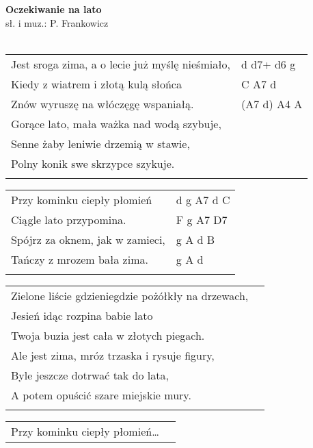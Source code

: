 \documentclass[a5paper]{article}
\begin{document}


\noindent
\fontsize{12pt}{15pt}\selectfont
\textbf{Oczekiwanie na lato} \\
\fontsize{8pt}{10pt}\selectfont
sł. i muz.: P. Frankowicz \\ \\
\fontsize{10pt}{12pt}\selectfont
{}
\begin{tabular}{@{}p{8.00cm}p{3cm}@{}}
\noindent
Jest sroga zima, a o lecie już myślę nieśmiało, & d d7+ d6 g \\
Kiedy z wiatrem i złotą kulą słońca & C A7 d \\
Znów wyruszę na włóczęgę wspaniałą. & (A7 d) A4 A \\
Gorące lato, mała ważka nad wodą szybuje, \\
Senne żaby leniwie drzemią w stawie, \\
Polny konik swe skrzypce szykuje. \\ \\
\end{tabular}

\noindent
\begin{tabular}{@{}p{7.00cm}p{3cm}@{}}
Przy kominku ciepły płomień & d g A7 d C \\
Ciągle lato przypomina. & F g A7 D7 \\
Spójrz za oknem, jak w zamieci, & g A d B \\
Tańczy z mrozem bała zima. & g A d \\ \\
\end{tabular}

\noindent
\begin{tabular}{@{}p{8.00cm}p{3cm}@{}}
Zielone liście gdzieniegdzie pożółkły na drzewach, \\
Jesień idąc rozpina babie lato \\
Twoja buzia jest cała w złotych piegach. \\
Ale jest zima, mróz trzaska i rysuje figury, \\
Byle jeszcze dotrwać tak do lata, \\
A potem opuścić szare miejskie mury. \\ \\
\end{tabular}

\noindent
\begin{tabular}{@{}p{8.00cm}p{3cm}@{}}
Przy kominku ciepły płomień…
\end{tabular}
\end{document}
